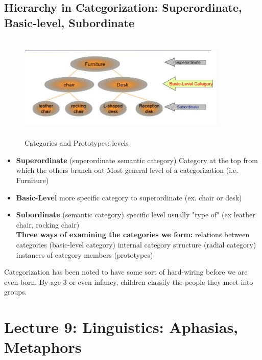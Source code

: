 \documentclass{article}
\begin{document}
\subsection{Hierarchy in Categorization: Superordinate, Basic-level, Subordinate}

\begin{figure}[htp]
\centering
\includegraphics[width=10cm, height=5cm]{images/prototypelevel.JPG}
\caption{Categories and Prototypes: levels}
\label{fig: categories}
\end{figure}

\begin{itemize}
    \item \textbf{Superordinate} (superordinate semantic category)
        \subitem Category at the top from which the others branch out
        \subitem Most general level of a categorization (i.e. Furniture)
    \item \textbf{Basic-Level}
        \subitem more specific category to superordinate (ex. chair or desk) 
    \item \textbf{Subordinate} (semantic category) 
        \subitem specific level usually "type of" (ex leather chair, rocking chair) \\
        
\textbf{Three ways of examining the categories we form: }
    \subitem relations between categories (basic-level category) 
    \subitem internal category structure (radial category) 
    \subitem instances of category members (prototypes) 
\end{itemize}

Categorization has been noted to have some sort of hard-wiring before we are even born. By age 3 or even infancy, children classify the people they meet into groups. \\


\newpage 
\section{Lecture 9: Linguistics: Aphasias, Metaphors}
\end{document}
